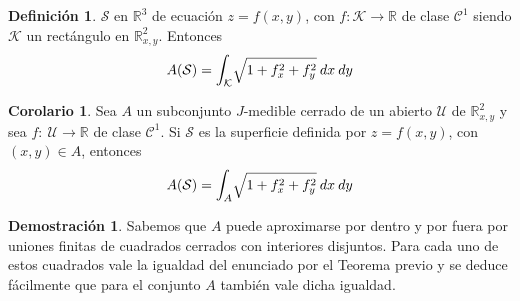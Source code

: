 \documentclass[12pt,twoside]{report}
\newcommand\mc[1]{\mathcal{#1}}
\theoremstyle{azul}
\theoremstyle{azul2}
\theoremstyle{plain}
\theoremstyle{definition}
\newtheorem{defin}{Definición}[chapter]
\newtheorem*{dem}{Demostración}
\newtheorem*{cor}{Corolario}
\theoremstyle{remark}
\begin{document}
\vspace{5cm}
\begin{defin}
$\mc{S}$ en $\mathbb{R}^3$ de ecuación $z=f(x,y)$, con $f: \mc{K} \longrightarrow \mathbb{R}$ de clase $\mc{C}^1$ siendo $\mc{K}$ un rectángulo en $\mathbb{R}^2_{x,y}$. Entonces 
$$A(\mc{S}) = \mathlarger{\int}_{\mc{K}} \sqrt{1 + f_x^2 + f_y^2} \: dx \: dy$$
\end{defin}
\begin{cor}
Sea $A$ un subconjunto $J$-medible cerrado de un abierto $\mc{U}$ de $\mathbb{R}^2_{x,y}$ y sea $f: \: \mc{U} \longrightarrow \mathbb{R}$ de clase $\mc{C}^1$. Si $\mc{S}$ es la superficie definida por $z=f(x,y)$, con $(x,y) \in A$, entonces
$$A(\mc{S})= \mathlarger{\int}_{A} \sqrt{1 + f_x^2 + f_y^2} \: dx \: dy$$
\end{cor}
\begin{dem}
Sabemos que $A$ puede aproximarse por dentro y por fuera por uniones finitas de cuadrados cerrados con interiores disjuntos. Para cada uno de estos cuadrados vale la igualdad del enunciado por el Teorema previo y se deduce fácilmente que para el conjunto $A$ también vale dicha igualdad.
\end{dem}
\end{document}
